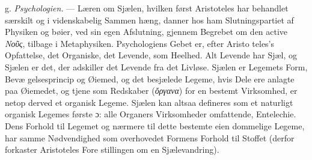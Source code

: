 \documentclass[12pt,a4paper]{book}
\newcommand{\gk}[1]{\textit{#1}}
\begin{document}
g. \emph{Psychologien.} --- Læren om Sjælen, hvilken først
Aristoteles har behandlet særskilt og i videnskabelig Sammen\-%
hæng, danner hos ham Slutningspartiet af Physiken og bøier,
ved sin egen Afslutning, gjennem Begrebet om den active \gk{Νοῦς},
tilbage i Metaphysiken. Psychologiens Gebet er, efter Aristo\-%
teles's Opfattelse, det Organiske, det Levende, som Heelhed.
Alt Levende har Sjæl, og Sjælen er det, der adskiller det
Levende fra det Livløse. Sjælen er Legemets Form, Bevæ\-%
gelsesprincip og Øiemed, og det besjælede Legeme, hvis Dele
ere anlagte paa Øiemedet, og tjene som Redskaber (\gk{ὄργανα})
for en bestemt Virksomhed, er netop derved et organisk Legeme.
Sjælen kan altsaa defineres som et naturligt organisk Legemes
første ɔ: alle Organers Virksomheder omfattende, Entelechie.
Dens Forhold til Legemet og nærmere til dette bestemte eien\-%
dommelige Legeme, har samme Nødvendighed som overhovedet
Formens Forhold til Stoffet (derfor forkaster Aristoteles Fore\-%
stillingen om en Sjælevandring).
\end{document}
